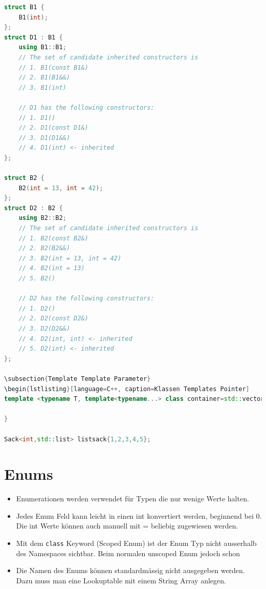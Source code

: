 \begin{lstlisting}[language=C++]
struct B1 {
	B1(int);
};
struct D1 : B1 {
	using B1::B1;
	// The set of candidate inherited constructors is 
	// 1. B1(const B1&)
	// 2. B1(B1&&)
	// 3. B1(int)
	
	// D1 has the following constructors:
	// 1. D1()
	// 2. D1(const D1&) 
	// 3. D1(D1&&)
	// 4. D1(int) <- inherited
};

struct B2 {
	B2(int = 13, int = 42);
};
struct D2 : B2 {
	using B2::B2;
	// The set of candidate inherited constructors is
	// 1. B2(const B2&)
	// 2. B2(B2&&)
	// 3. B2(int = 13, int = 42)
	// 4. B2(int = 13)
	// 5. B2()
	
	// D2 has the following constructors:
	// 1. D2()
	// 2. D2(const D2&)
	// 3. D2(D2&&)
	// 4. D2(int, int) <- inherited
	// 5. D2(int) <- inherited
};

\subsection{Template Template Parameter}
\begin{lstlisting}[language=C++, caption=Klassen Templates Pointer]
template <typename T, template<typename...> class container=std::vector> class Sack {
	
}

Sack<int,std::list> listsack{1,2,3,4,5};
\end{lstlisting}



\section{Enums}
\begin{itemize}
	\item Enumerationen werden verwendet für Typen die nur wenige Werte halten.
	\item Jedes Enum Feld kann leicht in einen int konvertiert werden, beginnend bei 0. Die int Werte können auch manuell mit = beliebig zugewiesen werden.
	\item Mit dem \lstinline|class| Keyword (Scoped Enum) ist der Enum Typ nicht ausserhalb des Namespaces sichtbar. Beim normalen unscoped Enum jedoch schon
	\item Die Namen des Enums können standardmässig nicht ausgegeben werden. Dazu muss man eine Lookuptable mit einem String Array anlegen.
\end{itemize}

